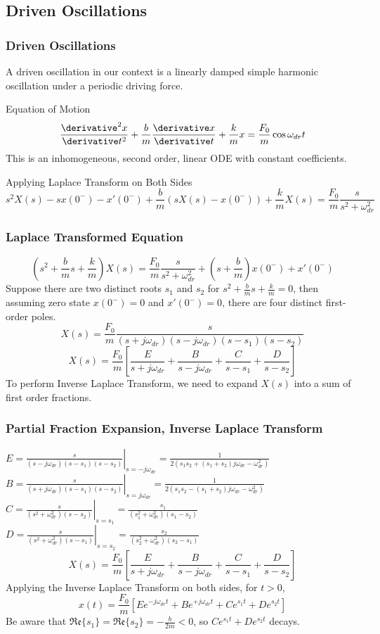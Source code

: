 \subsection{Driven Oscillations}
\begin{frame}
\frametitle{Driven Oscillations}
\begin{definition}
A \alert{driven oscillation} in our context is a \alert{linearly damped} simple harmonic oscillation under a \alert{periodic} driving force.
\end{definition}
\begin{block}{Equation of Motion}
\[\frac{\derivative^2 x}{\derivative t^2}+\frac{b}{m}\frac{\derivative x}{\derivative t}+\frac{k}{m}x=\frac{F_0}{m}\cos\omega_{dr}t\]
This is an \alert{inhomogeneous}, second order, \alert{linear} ODE with \alert{constant coefficients}.
\end{block}
\begin{block}{Applying Laplace Transform on Both Sides}
\[s^2X(s)-sx(0^-)-x'(0^-)+\frac{b}{m}(sX(s)-x(0^-))+\frac{k}{m}X(s)=\frac{F_0}{m}\frac{s}{s^2+\omega_{dr}^{2}}\]
\end{block}
\end{frame}
\begin{frame}
\frametitle{Laplace Transformed Equation}
\[(s^2+\frac{b}{m}s+\frac{k}{m})X(s)=\frac{F_0}{m}\frac{s}{s^2+\omega_{dr}^{2}}+(s+\frac{b}{m})x(0^-)+x'(0^-)\]
Suppose there are two \alert{distinct} roots $s_1$ and $s_2$ for $s^2+\frac{b}{m}s+\frac{k}{m}=0$, then assuming \alert{zero state} $x(0^-)=0$ and $x'(0^-)=0$, there are four distinct \alert{first-order poles}.
\[
X(s)=\frac{F_0}{m}\frac{s}{(s+j\omega_{dr})(s-j\omega_{dr})(s-s_1)(s-s_2)}
\]
\[
X(s)=\frac{F_0}{m}\left[\frac{E}{s+j\omega_{dr}}+\frac{B}{s-j\omega_{dr}}+\frac{C}{s-s_1}+\frac{D}{s-s_2}\right]
\]
To perform \alert{Inverse Laplace Transform}, we need to expand $X(s)$ into a sum of first order fractions.
\end{frame}
\begin{frame}
\frametitle{Partial Fraction Expansion, Inverse Laplace Transform}
$E=\left.\frac{s}{(s-j\omega_{dr})(s-s_1)(s-s_2)}\right|_{s=-j\omega_{dr}}=\frac{1}{2(s_1s_2+(s_1+s_2)j\omega_{dr}-\omega_{dr}^2)}$\\
$B=\left.\frac{s}{(s+j\omega_{dr})(s-s_1)(s-s_2)}\right|_{s=j\omega_{dr}}=\frac{1}{2(s_1 s_2-(s_1+s_2)j\omega_{dr}-\omega_{dr}^2)}$\\
$C=\left.\frac{s}{(s^2+\omega_{dr}^{2})(s-s_2)}\right|_{s=s_1}=\frac{s_1}{(s_1^2+\omega_{dr}^{2})(s_1-s_2)}$\\
$D=\left.\frac{s}{(s^2+\omega_{dr}^{2})(s-s_1)}\right|_{s=s_2}=\frac{s_2}{(s_2^2+\omega_{dr}^{2})(s_2-s_1)}$
\[X(s)=\frac{F_0}{m}\left[\frac{E}{s+j\omega_{dr}}+\frac{B}{s-j\omega_{dr}}+\frac{C}{s-s_1}+\frac{D}{s-s_2}\right]\]
Applying the \alert{Inverse Laplace Transform} on both sides, for $t>0$,
\[
x(t)=\frac{F_0}{m}\left[Ee^{-j\omega_{dr}t}+Be^{+j\omega_{dr}t}+Ce^{s_1 t}+De^{s_2 t}\right]
\]
Be aware that $\mathfrak{Re}\{s_1\}=\mathfrak{Re}\{s_2\}=-\frac{b}{2m}<0$, so $Ce^{s_1 t}+De^{s_2 t}$ \alert{decays}.
\end{frame}
